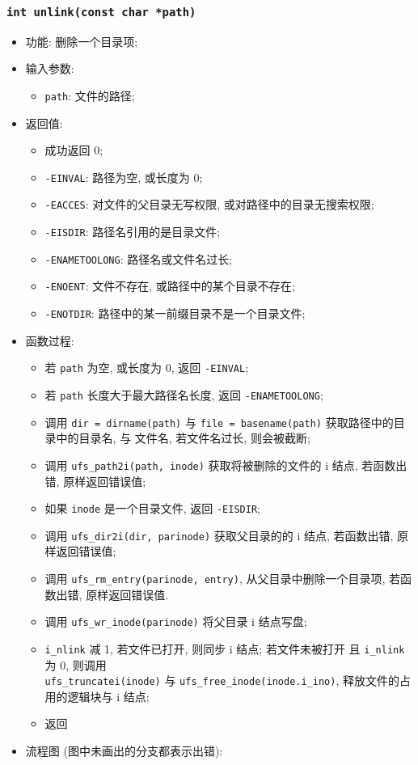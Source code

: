 \documentclass[nofonts, titlepage]{ctexart}
\begin{document}
  \subsubsection[\texttt{unlink}]{\texttt{int unlink(const char *path)}}
  \begin{itemize}
\item
  功能: 删除一个目录项;
\item
  输入参数:

  \begin{itemize}
  \item
    \texttt{path}: 文件的路径;
  \end{itemize}
\item
  返回值:

  \begin{itemize}
  \item
    成功返回 0;
  \item
    \texttt{-EINVAL}: 路径为空, 或长度为 0;
  \item
    \texttt{-EACCES}: 对文件的父目录无写权限,
    或对路径中的目录无搜索权限;
  \item
    \texttt{-EISDIR}: 路径名引用的是目录文件;
  \item
    \texttt{-ENAMETOOLONG}: 路径名或文件名过长;
  \item
    \texttt{-ENOENT}: 文件不存在, 或路径中的某个目录不存在;
  \item
    \texttt{-ENOTDIR}: 路径中的某一前缀目录不是一个目录文件;
  \end{itemize}
\item
  函数过程:

  \begin{itemize}
  \item
    若 \texttt{path} 为空, 或长度为 0, 返回 \texttt{-EINVAL};
  \item
    若 \texttt{path} 长度大于最大路径名长度, 返回
    \texttt{-ENAMETOOLONG};
  \item
    调用 \texttt{dir = dirname(path)} 与 \texttt{file = basename(path)}
    获取路径中的目录中的目录名, 与 文件名, 若文件名过长, 则会被截断;
  \item
    调用 \texttt{ufs\_path2i(path, inode)} 获取将被删除的文件的 i 结点,
    若函数出错, 原样返回错误值;
  \item
    如果 \texttt{inode} 是一个目录文件, 返回 \texttt{-EISDIR};
  \item
    调用 \texttt{ufs\_dir2i(dir, parinode)} 获取父目录的的 i 结点,
    若函数出错, 原样返回错误值;
  \item
    调用 \texttt{ufs\_rm\_entry(parinode, entry)},
    从父目录中删除一个目录项, 若函数出错, 原样返回错误值.
  \item
    调用 \texttt{ufs\_wr\_inode(parinode)} 将父目录 i 结点写盘;
  \item
      \verb'i_nlink' 减 1, 若文件已打开, 则同步 i 结点; 若文件未被打开
      且 \verb'i_nlink' 为 0, 则调用 \\\verb'ufs_truncatei(inode)' 与 
      \verb'ufs_free_inode(inode.i_ino)', 释放文件的占用的逻辑块与 i 结点;
  \item
    返回
  \end{itemize}
\item
  流程图
  (图中未画出的分支都表示出错):


\end{itemize}
\end{document}
